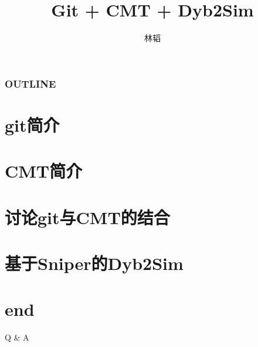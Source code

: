 \documentclass{beamer}
\begin{document}
\title{Git + CMT + Dyb2Sim}
\author{
    \texorpdfstring{林韬
                    \newline
                    \href{mailto:lintao@ihep.ac.cn}
                    {\footnotesize{}}}
                    {Lin Tao}
}


\maketitle

\begin{frame}
    \frametitle{OUTLINE}
    \tableofcontents
\end{frame}

\section{git简介}
    

\section{CMT简介}
    

\section{讨论git与CMT的结合}
    

\section{基于Sniper的Dyb2Sim}
    

\section*{end}
\begin{frame}
    \begin{center}
        \LARGE Q \& A
    \end{center}
\end{frame}
\end{document}
